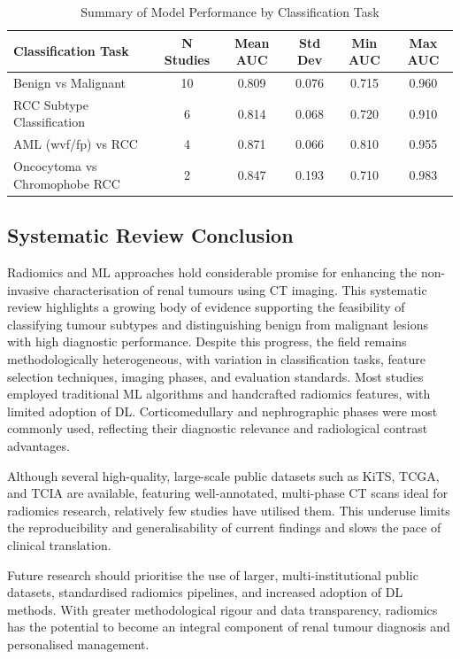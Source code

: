 \documentclass[final,british,a4paper,12pt]{phdthesis}
\begin{document}
\begin{table}[ht]
\centering
\caption{Summary of Model Performance by Classification Task}
\small
\begin{tabular}{lccccc}
\hline
\textsf{Classification Task} & \textsf{N Studies} & \textsf{Mean AUC} & \textsf{Std Dev} & \textsf{Min AUC} & \textsf{Max AUC} \\
\hline
Benign vs Malignant             & 10 & 0.809 & 0.076 & 0.715 & 0.960 \\
RCC Subtype Classification      & 6  & 0.814 & 0.068 & 0.720 & 0.910 \\
AML (wvf/fp) vs RCC             & 4  & 0.871 & 0.066 & 0.810 & 0.955 \\
Oncocytoma vs Chromophobe RCC  & 2  & 0.847 & 0.193 & 0.710 & 0.983 \\
\hline
\end{tabular}
\label{tab:task_performance_final}
\end{table}
\subsection{Systematic Review Conclusion}
Radiomics and ML approaches hold considerable promise for enhancing the non-invasive characterisation of renal tumours using CT imaging. This systematic review highlights a growing body of evidence supporting the feasibility of classifying tumour subtypes and distinguishing benign from malignant lesions with high diagnostic performance. Despite this progress, the field remains methodologically heterogeneous, with variation in classification tasks, feature selection techniques, imaging phases, and evaluation standards. Most studies employed traditional ML algorithms and handcrafted radiomics features, with limited adoption of DL. Corticomedullary and nephrographic phases were most commonly used, reflecting their diagnostic relevance and radiological contrast advantages.

Although several high-quality, large-scale public datasets such as KiTS, TCGA, and TCIA are available, featuring well-annotated, multi-phase CT scans ideal for radiomics research, relatively few studies have utilised them. This underuse limits the reproducibility and generalisability of current findings and slows the pace of clinical translation.

Future research should prioritise the use of larger, multi-institutional public datasets, standardised radiomics pipelines, and increased adoption of DL methods. With greater methodological rigour and data transparency, radiomics has the potential to become an integral component of renal tumour diagnosis and personalised management.
\end{document}
